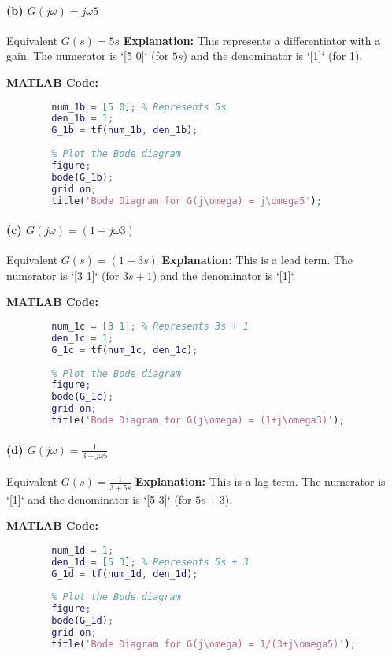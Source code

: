 \documentclass[a4paper,12pt]{article}
\begin{document}
	\paragraph{(b) $G(j\omega) = j\omega5$}
	Equivalent $G(s) = 5s$
	\textbf{Explanation:}
	This represents a differentiator with a gain. The numerator is `[5 0]` (for $5s$) and the denominator is `[1]` (for 1).
	
	\textbf{MATLAB Code:}
	\begin{lstlisting}[language=Matlab, caption=MATLAB Code for Problem 1(b)]
		% Define the transfer function G(s) = 5s
		num_1b = [5 0]; % Represents 5s
		den_1b = 1;
		G_1b = tf(num_1b, den_1b);
		
		% Plot the Bode diagram
		figure;
		bode(G_1b);
		grid on;
		title('Bode Diagram for G(j\omega) = j\omega5');
	\end{lstlisting}
	
	\paragraph{(c) $G(j\omega) = (1+j\omega3)$}
	Equivalent $G(s) = (1+3s)$
	\textbf{Explanation:}
	This is a lead term. The numerator is `[3 1]` (for $3s+1$) and the denominator is `[1]`.
	
	\textbf{MATLAB Code:}
	\begin{lstlisting}[language=Matlab, caption=MATLAB Code for Problem 1(c)]
		% Define the transfer function G(s) = (1+3s)
		num_1c = [3 1]; % Represents 3s + 1
		den_1c = 1;
		G_1c = tf(num_1c, den_1c);
		
		% Plot the Bode diagram
		figure;
		bode(G_1c);
		grid on;
		title('Bode Diagram for G(j\omega) = (1+j\omega3)');
	\end{lstlisting}
	
	\paragraph{(d) $G(j\omega) = \frac{1}{3+j\omega5}$}
	Equivalent $G(s) = \frac{1}{3+5s}$
	\textbf{Explanation:}
	This is a lag term. The numerator is `[1]` and the denominator is `[5 3]` (for $5s+3$).
	
	\textbf{MATLAB Code:}
	\begin{lstlisting}[language=Matlab, caption=MATLAB Code for Problem 1(d)]
		% Define the transfer function G(s) = 1/(3+5s)
		num_1d = 1;
		den_1d = [5 3]; % Represents 5s + 3
		G_1d = tf(num_1d, den_1d);
		
		% Plot the Bode diagram
		figure;
		bode(G_1d);
		grid on;
		title('Bode Diagram for G(j\omega) = 1/(3+j\omega5)');
	\end{lstlisting}
	
\end{document}
